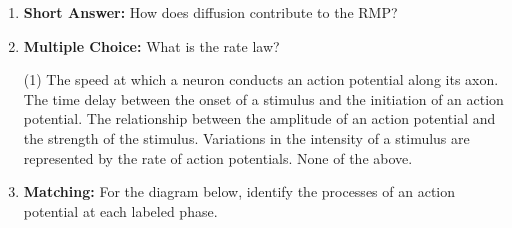 \begin{enumerate}[label=\textbf{Q2.3.\arabic*}]
      \item \textbf{Short Answer:} How does diffusion contribute to the RMP? \\

      \item \textbf{Multiple Choice:} What is the rate law? 
            \begin{tasks}[label=(\Alph*), label-width=1.5em, item-indent=1.7em](1)
                  \task The speed at which a neuron conducts an action potential along its axon.
                  \task The time delay between the onset of a stimulus and the initiation of an action potential.
                  \task The relationship between the amplitude of an action potential and the strength of the stimulus.
                  \task Variations in the intensity of a stimulus are represented by the rate of action potentials.
                  \task None of the above.
            \end{tasks}


      \newpage 

      \item \textbf{Matching:} For the diagram below, identify the processes of an action potential at each labeled phase.


\end{enumerate}
